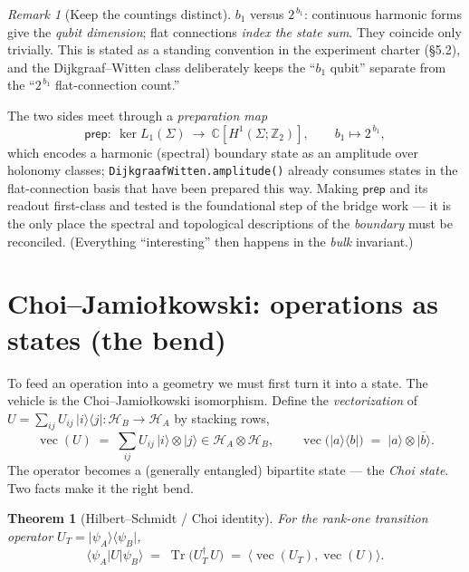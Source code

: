 \documentclass[11pt]{article}
\theoremstyle{plain}
\newtheorem{theorem}{Theorem}
\theoremstyle{definition}
\theoremstyle{remark}
\newtheorem{remark}{Remark}
\newcommand{\C}{\mathbb{C}}
\newcommand{\Z}{\mathbb{Z}}
\newcommand{\HH}{\mathcal{H}}
\newcommand{\vecop}{\operatorname{vec}}
\newcommand{\Tr}{\operatorname{Tr}}
\newcommand{\ket}[1]{\lvert #1 \rangle}
\newcommand{\bra}[1]{\langle #1 \rvert}
\newcommand{\inner}[2]{\langle #1 , #2 \rangle}
\newcommand{\ip}[3]{\langle #1 \vert #2 \vert #3 \rangle}
\newcommand{\adj}{^{\dagger}}
\begin{document}
\begin{remark}[Keep the countings distinct]
$b_1$ versus $2^{\,b_1}$: continuous harmonic forms give the \emph{qubit
dimension}; flat connections \emph{index the state sum}. They coincide only
trivially. This is stated as a standing convention in the experiment charter
(\S5.2), and the Dijkgraaf--Witten class deliberately keeps the ``$b_1$
qubit'' separate from the ``$2^{\,b_1}$ flat-connection count.''
\end{remark}

The two sides meet through a \emph{preparation map}
\begin{equation}
\mathsf{prep}:\ \ker L_1(\Sigma)\ \longrightarrow\ \C[H^1(\Sigma;\Z_2)],
\qquad b_1 \mapsto 2^{\,b_1},
\end{equation}
which encodes a harmonic (spectral) boundary state as an amplitude over holonomy
classes; \texttt{DijkgraafWitten.amplitude()} already consumes states in the
flat-connection basis that have been prepared this way. Making $\mathsf{prep}$
and its readout first-class and tested is the foundational step of the bridge
work --- it is the only place the spectral and topological descriptions of the
\emph{boundary} must be reconciled. (Everything ``interesting'' then happens in
the \emph{bulk} invariant.)

\section{Choi--Jamio\l kowski: operations as states (the bend)}\label{sec:choi}

To feed an operation into a geometry we must first turn it into a state. The
vehicle is the Choi--Jamio\l kowski isomorphism. Define the \emph{vectorization}
of $U = \sum_{ij} U_{ij}\,\ket{i}\!\bra{j} : \HH_B\!\to\!\HH_A$ by stacking rows,
\begin{equation}
\vecop(U) \;=\; \sum_{ij} U_{ij}\,\ket{i}\otimes\ket{j} \in \HH_A\otimes\HH_B,
\qquad
\vecop\big(\ket{a}\!\bra{b}\big) \;=\; \ket{a}\otimes\overline{\ket{b}} .
\end{equation}
The operator becomes a (generally entangled) bipartite state --- the
\emph{Choi state}. Two facts make it the right bend.

\begin{theorem}[Hilbert--Schmidt / Choi identity]\label{thm:hs}
For the rank-one transition operator $U_T = \ket{\psi_A}\!\bra{\psi_B}$,
\begin{equation}
\ip{\psi_A}{U}{\psi_B} \;=\; \Tr\!\big(U_T\adj\,U\big)
\;=\; \inner{\vecop(U_T)}{\vecop(U)} .
\end{equation}
\end{theorem}
\end{document}
